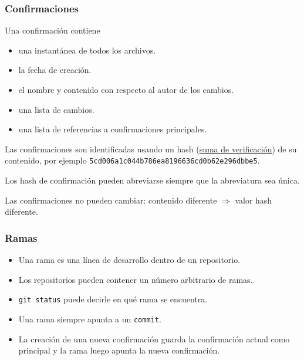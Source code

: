 \begin{frame}[fragile]
	\frametitle{Confirmaciones
		🔖}

	Una confirmación contiene
	\begin{itemize}
		\item
		
		una instantánea de todos los archivos.
		
		\item
		
		la fecha de creación.
		
		\item
		
		el nombre y contenido con respecto al autor de los cambios.
		
		\item
		
		una lista de cambios.
		
		\item
		
		una lista de referencias a confirmaciones principales.
	\end{itemize}

	Las confirmaciones son identificadas usando un hash
	(\href{https://es.wikipedia.org/wiki/Suma_de_verificaci%C3%B3n}{suma de verificación})
	de su contenido, por ejemplo \lstinline|5cd006a1c044b786ea8196636cd0b62e296dbbe5|.

	Los hash de confirmación pueden abreviarse siempre que la
	abreviatura sea única.

	Las confirmaciones no pueden cambiar: contenido diferente
	$\Rightarrow$ valor hash diferente.

\end{frame}

\begin{frame}
	\frametitle{Ramas 🌲}

	\begin{itemize}
		\item
		
		Una rama es una línea de desarrollo dentro de un
		      repositorio.
		
			  \item
			  
			  Los repositorios pueden contener un número arbitrario de
		      ramas.
		
			  \item
			  
			  \lstinline|git status| puede decirle en qué rama
		      se encuentra.
		
			  \item
			  
			  Una rama siempre apunta a un \lstinline|commit|.
		
			  \item
			  
			  La creación de una nueva confirmación guarda la
		      confirmación actual como principal y la rama luego apunta
		      la nueva confirmación.
	\end{itemize}

\end{frame}

